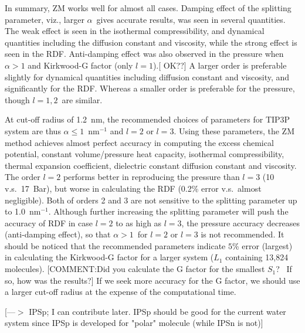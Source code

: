 \documentclass[a4paper,preprint,unsortedaddress,onecolumn,fleqn]{revtex4}
\begin{document}
In summary, ZM works well for almost all cases. Damping effect of the
splitting parameter, viz., larger $\alpha $\ gives accurate results, was
seen in several quantities. The weak effect is seen in the isothermal
compressibility, {\color{red} } and dynamical quantities including the
diffusion constant and viscosity, while the strong effect is seen in the
RDF. Anti-damping effect was also observed in the pressure when $\alpha >1$
and  {\color{blue}Kirkwood-G factor (only $l=1$).[ OK??}] A larger order is
preferable slightly for dynamical quantities including diffusion constant
and viscosity, and significantly for the RDF. Whereas a smaller order is
preferable for the pressure, though $l=1,2$\ are similar.

{\color{red} At cut-off radius of 1.2~nm, the recommended choices of
parameters for TIP3P system are thus $\alpha \leq 1$~$\text{nm}^{-1}$ and $%
l=2$ or $l=3$. Using these parameters, the ZM method achieves almost perfect
accuracy in computing the excess chemical potential, constant
volume/pressure heat capacity, isothermal compressibility, thermal expansion
coefficient, dielectric constant diffusion constant and viscosity. The order 
$l=2$ performs better in reproducing the pressure than $l=3$ (10
v.s.~17~Bar), but worse in calculating the RDF (0.2\% error v.s.~almost
negligible). Both of orders 2 and 3 are not sensitive to the splitting
parameter up to 1.0~$\text{nm}^{-1}$.} {\color{blue} Although further
increasing the splitting parameter will push the accuracy of RDF in case $l=2
$ to as high as $l=3$, the pressure accuracy decreases (anti-damping
effect), so that $\alpha >1$\ for $l=2$ or $l=3$ is not recommended. It
should be noticed that the recommended parameters indicate $5$\% error
(largest) in calculating the Kirkwood-G factor for a larger system ($L_{1}$
containing 13,824 molecules). [\color{blue}COMMENT:Did you calculate the G
factor for the smallest $S_{1}$? \ If so, how was the results?] If we seek
more accuracy for the G factor, we should use a larger cut-off radius at the
expense of the computational time. } 

[{\color{blue}---$>$ IPSp; I can contribute later. IPSp should be good for
the current water system since IPSp is developed for "polar" molecule (while
IPSn is not)}]
\end{document}
